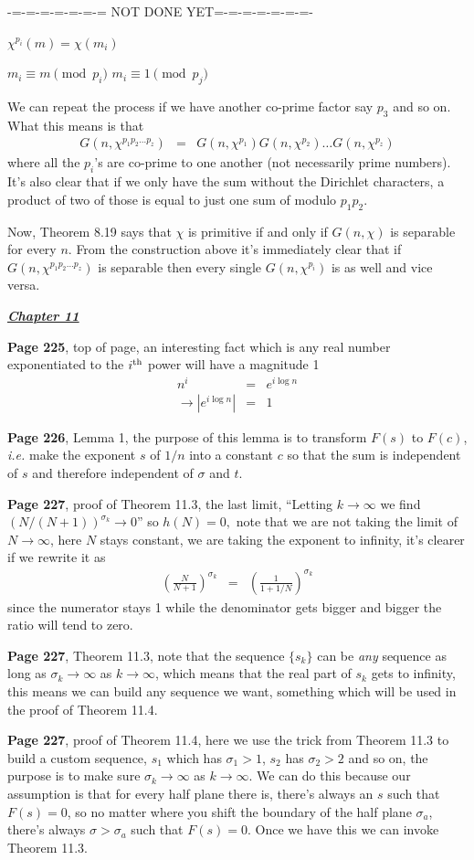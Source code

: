 \documentclass[aps,preprint,preprintnumbers,nofootinbib,showpacs,prd]{revtex4-1}
\newcommand{\ie}{{\it i.e.} }
\newcommand{\nbea}{\begin{eqnarray*}}
\newcommand{\neea}{\end{eqnarray*}}
\begin{document}
-=-=-=-=-=-=-= NOT DONE YET=-=-=-=-=-=-=-

$\chi^{p_i}(m) = \chi(m_i)$

$m_i \equiv m \pmod{p_i}$ $m_i \equiv 1 \pmod{p_j}$

We can repeat the process if we have another co-prime factor say $p_3$ and so on. What this means is that
%
\nbea
G(n, \chi^{p_1p_2 \dots p_z}) & = & G(n, \chi^{p_1})G(n, \chi^{p_2}) \dots G(n, \chi^{p_z})
\neea
%
where all the $p_i$'s are co-prime to one another (not necessarily prime numbers). It's also clear that if we only have the sum without the Dirichlet characters, a product of two of those is equal to just one sum of modulo $p_1p_2$.

Now, Theorem 8.19 says that $\chi$ is primitive if and only if $G(n,\chi)$ is separable for every $n$. From the construction above it's immediately clear that if $G(n, \chi^{p_1p_2 \dots p_z})$ is separable then every single $G(n, \chi^{p_i})$ is as well and vice versa.

\bigskip
\underline{\textbf{\textit{Chapter 11}}}
\bigskip

{\bf Page 225}, top of page, an interesting fact which is any real number exponentiated to the $i^{\rm th}$ power will have a magnitude 1
%
\nbea
n^i & = & e^{i \log n} \\
\to |e^{i \log n}| & = & 1
\neea
%

{\bf Page 226}, Lemma 1, the purpose of this lemma is to transform $F(s)$ to $F(c)$, \ie make the exponent $s$ of $1/n$ into a constant $c$ so that the sum is independent of $s$ and therefore independent of $\sigma$ and $t$.

{\bf Page 227}, proof of Theorem 11.3, the last limit, ``Letting $k\to\infty$ we find $(N/(N+1))^{\sigma_k} \to 0$'' so $h(N) = 0,$ note that we are not taking the limit of $N \to \infty$, here $N$ stays constant, we are taking the exponent to infinity, it's clearer if we rewrite it as
%
\nbea
\left ( \frac{N}{N+1} \right )^{\sigma_k} & = & \left ( \frac{1}{1+1/N} \right )^{\sigma_k}
\neea
%
since the numerator stays 1 while the denominator gets bigger and bigger the ratio will tend to zero.

{\bf Page 227}, Theorem 11.3, note that the sequence $\{s_k\}$ can be {\it any} sequence as long as $\sigma_k\to\infty$ as $k\to\infty$, which means that the real part of $s_k$ gets to infinity, this means we can build any sequence we want, something which will be used in the proof of Theorem 11.4.

{\bf Page 227}, proof of Theorem 11.4, here we use the trick from Theorem 11.3 to build a custom sequence, $s_1$ which has $\sigma_1 > 1$, $s_2$ has $\sigma_2>2$ and so on, the purpose is to make sure $\sigma_k\to\infty$ as $k\to\infty$. We can do this because our assumption is that for every half plane there is, there's always an $s$ such that $F(s) = 0$, so no matter where you shift the boundary of the half plane $\sigma_a$, there's always $\sigma > \sigma_a$ such that $F(s) = 0$. Once we have this we can invoke Theorem 11.3.
\end{document}
